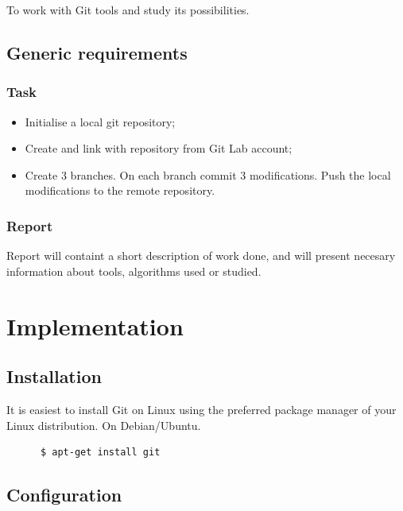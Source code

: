 \documentclass[12pt]{article}
\begin{document}
  To work with Git tools and study its possibilities.

  \subsection{Generic requirements}

  \subsubsection{Task}

  \begin{itemize}
    \item Initialise a local git repository;
    \item Create and link with repository from Git Lab account;
    \item Create 3 branches. On each branch commit 3 modifications. Push the local
              modifications to the remote repository.
  \end{itemize}

  \subsubsection{Report}

  Report will containt a short description of work done, and will present necesary information
  about tools, algorithms used or studied.


  \section{Implementation}

    \subsection{Installation}
    It is easiest to install Git on Linux using the preferred package manager of your Linux distribution.
    On Debian/Ubuntu.

    \begin{lstlisting}
      $ apt-get install git
    \end{lstlisting}

    \subsection{Configuration}
\end{document}
